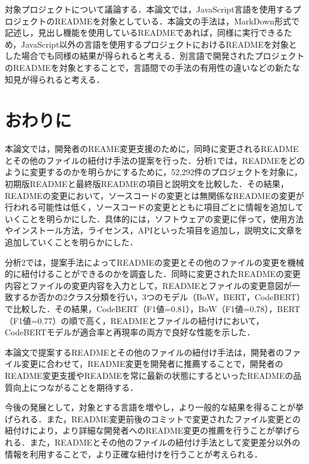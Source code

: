 \documentclass[submit]{ipsj}
\begin{document}
対象プロジェクトについて議論する．本論文では，JavaScript言語を使用するプロジェクトのREADMEを対象としている．本論文の手法は，MarkDown形式で記述し，見出し機能を使用しているREADMEであれば，同様に実行できるため，JavaScript以外の言語を使用するプロジェクトにおけるREADMEを対象とした場合でも同様の結果が得られると考える．別言語で開発されたプロジェクトのREADMEを対象とすることで，言語間での手法の有用性の違いなどの新たな知見が得られると考える．







\section{おわりに}
本論文では，開発者のREAME変更支援のために，同時に変更されるREADMEとその他のファイルの紐付け手法の提案を行った．分析1では，READMEをどのように変更するのかを明らかにするために，52,292件のプロジェクトを対象に，初期版READMEと最終版READMEの項目と説明文を比較した．その結果，READMEの変更において，ソースコードの変更とは無関係なREADMEの変更が行われる可能性は低く，ソースコードの変更とともに項目ごとに情報を追加していくことを明らかにした．具体的には，ソフトウェアの変更に伴って，使用方法やインストール方法，ライセンス，APIといった項目を追加し，説明文に文章を追加していくことを明らかにした．

分析2では，提案手法によってREADMEの変更とその他のファイルの変更を機械的に紐付けることができるのかを調査した．同時に変更されたREADMEの変更内容とファイルの変更内容を入力として，READMEとファイルの変更意図が一致するか否かの2クラス分類を行い，3つのモデル（BoW，BERT，CodeBERT）で比較した．その結果，CodeBERT（F1値=0.81），BoW（F1値=0.78），BERT（F1値=0.77）の順で高く，READMEとファイルの紐付けにおいて，CodeBERTモデルが適合率と再現率の両方で良好な性能を示した．

本論文で提案するREADMEとその他のファイルの紐付け手法は，開発者のファイル変更に合わせて，README変更を開発者に推薦することで，開発者のREADME変更支援やREADMEを常に最新の状態にするといったREADMEの品質向上につながることを期待する．

今後の発展として，対象とする言語を増やし，より一般的な結果を得ることが挙げられる．また，README変更前後のコミットで変更されたファイル変更との紐付けにより，より詳細な開発者へのREADME変更の推薦を行うことが挙げられる．また，READMEとその他のファイルの紐付け手法として変更差分以外の情報を利用することで，より正確な紐付けを行うことが考えられる．
\end{document}
